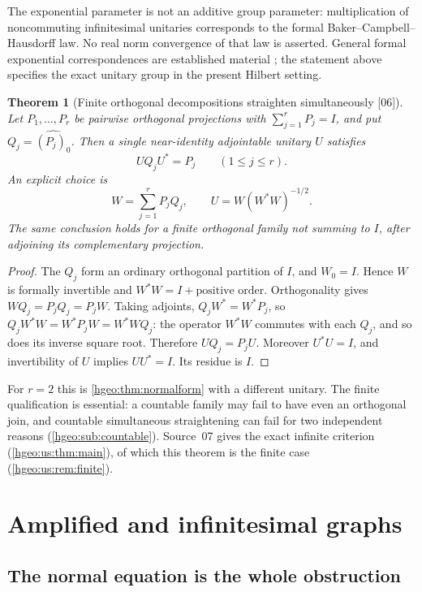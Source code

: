 \documentclass[11pt,letterpaper]{article}
\numberwithin{equation}{section}
\newtheorem{theorem}{Theorem}[section]
\theoremstyle{definition}
\theoremstyle{remark}
\newcommand{\src}[1]{\textup{\textsf{\small[#1]}}}
\begin{document}
The exponential parameter is not an additive group parameter:
multiplication of noncommuting infinitesimal unitaries corresponds to the
formal Baker--Campbell--Hausdorff law. No real norm convergence of that law
is asserted. General formal exponential correspondences are established
material \cite{Bagayoko}; the statement above specifies the exact unitary
group in the present Hilbert setting.

\begin{theorem}[Finite orthogonal decompositions straighten simultaneously
\src{06}]\label{hgeo:thm:finite}
Let $P_1,\ldots,P_r$ be pairwise orthogonal projections with
$\sum_{j=1}^rP_j=I$, and put $Q_j=\widehat{(P_j)_0}$. Then a single
near-identity adjointable unitary $U$ satisfies
\[
 UQ_jU^*=P_j\qquad(1\le j\le r).
\]
An explicit choice is
\[
 W=\sum_{j=1}^rP_jQ_j,\qquad U=W(W^*W)^{-1/2}.
\]
The same conclusion holds for a finite orthogonal family not summing to
$I$, after adjoining its complementary projection.
\end{theorem}
\begin{proof}
The $Q_j$ form an ordinary orthogonal partition of $I$, and $W_0=I$.
Hence $W$ is formally invertible and $W^*W=I+\text{positive order}$.
Orthogonality gives $WQ_j=P_jQ_j=P_jW$. Taking adjoints,
$Q_jW^*=W^*P_j$, so $Q_jW^*W=W^*P_jW=W^*WQ_j$: the operator $W^*W$ commutes
with each $Q_j$, and so does its inverse square root. Therefore
$UQ_j=P_jU$. Moreover $U^*U=I$, and invertibility of $U$ implies $UU^*=I$.
Its residue is $I$.
\end{proof}

For $r=2$ this is \cref{hgeo:thm:normalform} with a different unitary. The
finite qualification is essential: a countable family may fail to have even
an orthogonal join, and countable simultaneous straightening can fail for two
independent reasons (\cref{hgeo:sub:countable}). Source~07 gives the exact
infinite criterion (\cref{hgeo:us:thm:main}), of which this theorem is the
finite case (\cref{hgeo:us:rem:finite}).

\section{Amplified and infinitesimal graphs}
\label{hgeo:sec:graphs}

\subsection{The normal equation is the whole obstruction}
\end{document}
